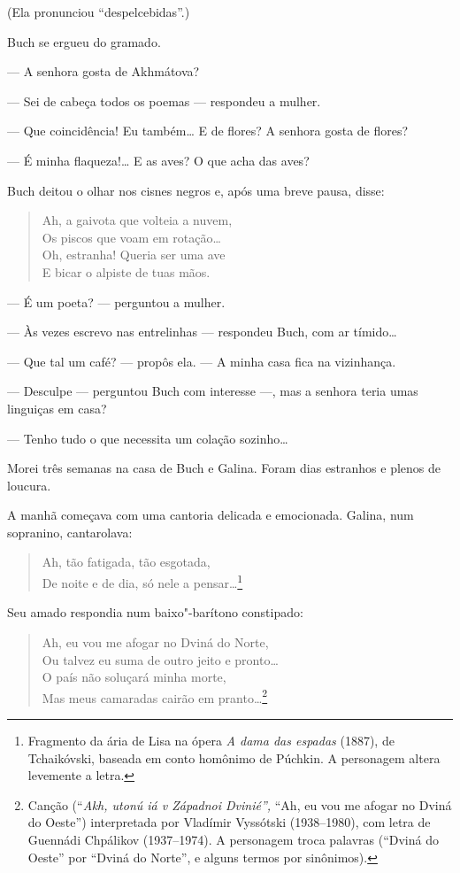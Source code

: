 (Ela pronunciou ``despelcebidas''.)

Buch se ergueu do gramado.

--- A senhora gosta de Akhmátova?

--- Sei de cabeça todos os poemas --- respondeu a mulher.

--- Que coincidência! Eu também\ldots{} E de flores? A senhora gosta de
flores?

--- É minha flaqueza!\ldots{} E as aves? O que acha das aves?

Buch deitou o olhar nos cisnes negros e, após uma breve pausa, disse:

\begin{verse}
Ah, a gaivota que volteia a nuvem,\\
Os piscos que voam em rotação\ldots{}\\
Oh, estranha! Queria ser uma ave\\
E bicar o alpiste de tuas mãos.
\end{verse}

--- É um poeta? --- perguntou a mulher.

--- Às vezes escrevo nas entrelinhas --- respondeu Buch, com ar
tímido\ldots{}

--- Que tal um café? --- propôs ela. --- A minha casa fica na
vizinhança.

--- Desculpe --- perguntou Buch com interesse ---, mas a senhora teria
umas linguiças em casa?

--- Tenho tudo o que necessita um colação sozinho\ldots{}

Morei três semanas na casa de Buch e Galina. Foram dias estranhos e
plenos de loucura.

A manhã começava com uma cantoria delicada e emocionada. Galina, num
sopranino, cantarolava:

\begin{verse}
Ah, tão fatigada, tão esgotada,\\
De noite e de dia, só nele a pensar\ldots{}\footnote{Fragmento da ária de
  Lisa na ópera \emph{A dama das espadas} (1887), de Tchaikóvski,
  baseada em conto homônimo de Púchkin. A personagem altera levemente a
  letra.}
\end{verse}

Seu amado respondia num baixo"-barítono constipado:

\begin{verse}
Ah, eu vou me afogar no Dviná do Norte,\\
Ou talvez eu suma de outro jeito e pronto\ldots{}\\
O país não soluçará minha morte,\\
Mas meus camaradas cairão em pranto\ldots{}\footnote{Canção (``\emph{Akh,
  utonú iá v Západnoi Dvinié'',} ``Ah, eu vou me afogar no Dviná do
  Oeste'') interpretada por Vladímir Vyssótski (1938--1980), com letra
  de Guennádi Chpálikov (1937--1974). A personagem troca palavras
  (``Dviná do Oeste'' por ``Dviná do Norte'', e alguns termos por
  sinônimos).}
\end{verse}


